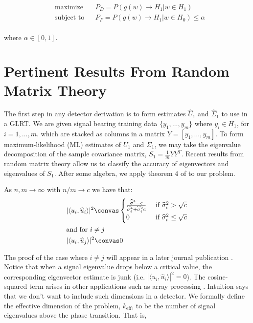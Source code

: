 \begin{equation}\label{eq:maximization}
\begin{aligned}
&\text{maximize}
&& P_D=P\left(g(w)\to H_1 | w\in H_1\right)\\
&\text{subject to}
&& P_F=P\left(g(w)\to H_1 | w\in H_0\right)\leq\alpha\\
\end{aligned}
\end{equation}

where $\alpha\in[0,1]$.

\section{Pertinent Results From Random Matrix Theory}\label{sec:params}
The first step in any detector derivation is to form estimates $\widehat{U}_1$ and $\widehat{\Sigma}_1$ to use in a GLRT. We are given signal bearing training data $\{y_1,\dots,y_m\}$ where $y_i\in H_1$, for $i=1,\dots,m$. which are stacked as columns in a matrix $Y=[y_1,\dots,y_m]$. To form maximum-likelihood (ML) estimates of $U_1$ and $\Sigma_1$, we may take the eigenvalue decomposition of the sample covariance matrix, $S_1=\frac{1}{m}YY^T$. Recent results from random matrix theory allow us to classify the accuracy of eigenvectors and eigenvalues of $S_1$. After some algebra, we apply theorem 4 of \cite{paul2007asymptotics} to our problem.

\begin{Th}\label{th:angles}
As $n,m \longrightarrow \infty$ with $n/m \to c$ we have that:
\begin{equation*}
\begin{aligned}
&|\langle u_i,\widehat{u}_i\rangle|^2\convas
\begin{cases}
\frac{\widehat{\sigma}^4-c}{\widehat{\sigma}_{i}^4+\widehat{\sigma}_{i}^2c} & \text{ if } \widehat{\sigma}_{i}^2>\sqrt{c}\\
0 & \text{ if } \widehat{\sigma}_{i}^2\leq\sqrt{c}\\
\end{cases}\\
&\text{and for } i\neq j\\
&|\langle u_i,\widehat{u}_j\rangle|^2\convas 0 \\
\end{aligned}
\end{equation*}
\end{Th}

The proof of the case where $i\neq j$ will appear in a later journal publication \cite{asendorf}. Notice that when a signal eigenvalue drops below a critical value, the corresponding eigenvector estimate is junk (i.e. $|\langle u_i,\widehat{u}_i\rangle|^2=0$). The cosine-squared term arises in other applications such as array processing \cite{cox1973resolving}. Intuition says that we don't want to include such dimensions in a detector. We formally define the effective dimension of the problem, $k_\text{eff}$, to be the number of signal eigenvalues above the phase transition. That is,

